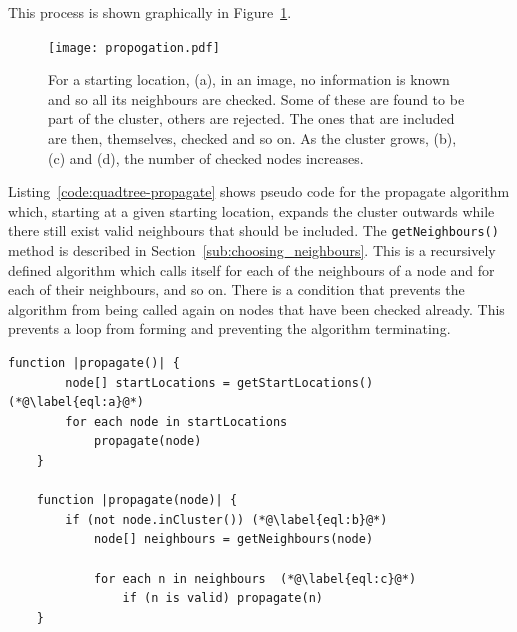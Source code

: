 This process is shown graphically in Figure~\ref{fig:propogation}.

\begin{figure}[tbh]
	\centering
	\texttt{[image: propogation.pdf]}

	\caption[Propagation of a cluster from a starting location.]{For a starting
		location, (a), in an image, no information is known and so all its
		neighbours are checked. Some of these are found to be part of the
		cluster, others are rejected. The ones that are included are then,
		themselves, checked and so on. As the cluster grows, (b), (c) and
		(d), the number of checked nodes increases.}\label{fig:propogation}
\end{figure}

Listing~\ref{code:quadtree-propagate} shows pseudo code for the propagate
algorithm which, starting at a given starting location, expands the cluster
outwards while there still exist valid neighbours that should be included. The
\texttt{getNeighbours()} method is described in
Section~\ref{sub:choosing_neighbours}. This is a recursively defined algorithm
which calls itself for each of the neighbours of a node and for each of their
neighbours, and so on. There is a condition that prevents the algorithm from
being called again on nodes that have been checked already. This prevents a
loop from forming and preventing the algorithm terminating.

\begin{center}
\begin{minipage}{\textwidth}
\begin{lstlisting}[caption={[Code for the propagate algorithm.]Code for the
	propagate algorithm which expands an initial starting location to a
	cluster.}, label=code:quadtree-propagate]
	function |propagate()| {
		node[] startLocations = getStartLocations() (*@\label{eql:a}@*)
		for each node in startLocations
			propagate(node)
	}

	function |propagate(node)| {
		if (not node.inCluster()) (*@\label{eql:b}@*)
			node[] neighbours = getNeighbours(node)

			for each n in neighbours  (*@\label{eql:c}@*)
				if (n is valid) propagate(n)
	}
\end{lstlisting}
\end{minipage}
\end{center}

